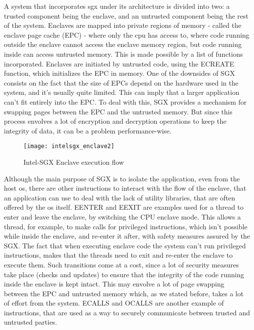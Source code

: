 A system that incorporates \gls{sgx} under its architecture is divided into two: a trusted component being the enclave, and an untrusted component being the rest of the system.
Enclaves are mapped into private regions of memory - called the enclave page cache (EPC) - where only the \gls{cpu} has access to, where code running outside the enclave cannot access the enclave memory region, but code running inside can access untrusted memory. This is made possible by a list of functions incorporated.
Enclaves are initiated by untrusted code, using the ECREATE function, which initializes the EPC in memory. One of the downsides of SGX consists on the fact that the size of EPCs depend on the hardware used in the system, and it's usually quite limited. This can imply that a larger application can't fit entirely into the EPC. To deal with this, SGX provides a mechanism for swapping pages between the EPC and the untrusted memory. But since this process envolves a lot of encryption and decryption operations to keep the integrity of data, it can be a problem performance-wise. 

\begin{figure}[htbp]
	\centering
	{\texttt{[image: intelsgx\_enclave2]}}
	\caption{Intel-SGX Enclave execution flow}
	\label{fig:sgxEnclave}
\end{figure}

Although the main purpose of SGX is to isolate the application, even from the host \gls{os}, there are other instructions to interact with the flow of the enclave, that an application can use to deal with the lack of utility libraries, that are often offered by the \gls{os} itself.
EENTER and EEXIT are examples used for a thread to enter and leave the enclave, by switching the CPU enclave mode. This allows a thread, for example, to make calls for privileged instructions, which isn't possible while inside the enclave, and re-enter it after, with safety measures assured by the SGX. The fact that when executing enclave code the system can't run privileged instructions, makes that the threads need to exit and re-enter the enclave to execute them. Such transitions come at a cost, since a lot of security measures take place (checks and updates) to ensure that the integrity of the code running inside the enclave is kept intact. This may envolve a lot of page swapping between the EPC and untrusted memory which, as we stated before, takes a lot of effort from the system.
ECALLS and OCALLS are another example of instructions, that are used as a way to securely communicate between trusted and untrusted parties. 



